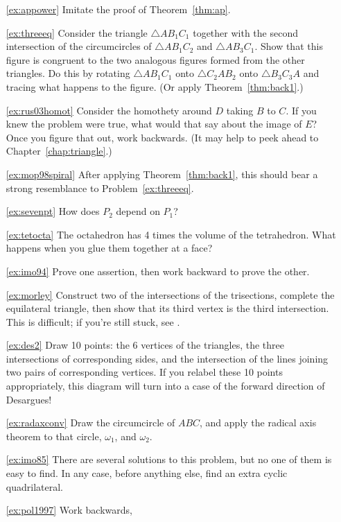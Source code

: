 \documentclass[12pt]{book}
\numberwithin{exc}{section}
\numberwithin{figure}{section}
\numberwithin{equation}{theorem}
\begin{document}
\begin{itemize}
\item[\ref{ex:appower}]
Imitate the proof of Theorem~\ref{thm:ap}.
\item[\ref{ex:threeeq}]
Consider the triangle $\triangle
AB_1C_1$ together with 
the second intersection of the circumcircles of $\triangle
AB_1C_2$ and $\triangle AB_3C_1$.
Show that this figure is congruent to the two analogous figures 
formed from the other triangles. Do this by rotating
$\triangle AB_1C_1$ onto $\triangle
C_2AB_2$ onto $\triangle B_3C_3A$ and tracing what happens to
the figure. (Or apply Theorem~\ref{thm:back1}.)
\item[\ref{ex:rus03homot}]
Consider the homothety around $D$ taking $B$ to $C$. If you knew the
problem were true, what would that say about the image of $E$? Once you
figure that out, work backwards. (It may help to peek ahead to
Chapter~\ref{chap:triangle}.)
\item[\ref{ex:mop98spiral}]
After applying Theorem~\ref{thm:back1}, this should bear a strong
resemblance to Problem~\ref{ex:threeeq}.
\item[\ref{ex:sevenpt}]
How does $P_2$ depend on $P_1$?
\item[\ref{ex:tetocta}] The octahedron has 4 times the volume of the
tetrahedron. What happens when you glue them together at a face?
\item[\ref{ex:imo94}]
Prove one assertion, then work backward to prove the other.
\item[\ref{ex:morley}] Construct two of the intersections of the trisections,
complete the equilateral triangle, then show that its third vertex is
the third intersection. This is difficult;
if you're still stuck, see \cite{bib:cg}.
\item[\ref{ex:des2}] Draw 10 points: the 6 vertices of the triangles, the
three intersections of corresponding sides, and the intersection of the
lines joining two pairs of corresponding vertices. If you relabel these
10 points appropriately, this diagram will turn into a case of the forward
direction of Desargues!
\item[\ref{ex:radaxconv}]
Draw the circumcircle of $ABC$, and apply the radical axis theorem to
that circle, $\omega_1$, and $\omega_2$.
\item[\ref{ex:imo85}]
There are several solutions to this problem, but no one of them 
is easy to find.
In any case, before anything else, find an extra cyclic quadrilateral.
\item[\ref{ex:pol1997}]
Work backwards,

\end{itemize}
\end{document}
